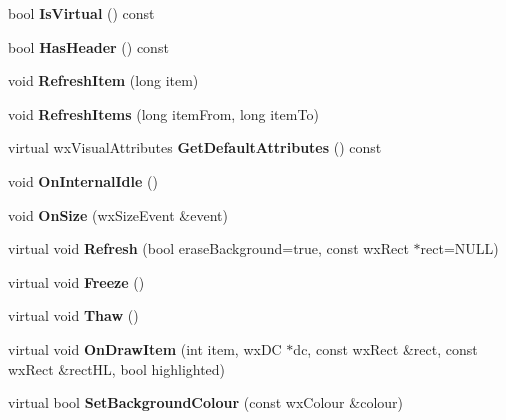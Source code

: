 \begin{DoxyCompactItemize}
\item 
bool {\bfseries IsVirtual} () const \label{classMuleExtern_1_1wxGenericListCtrl_aef095ce46b4004f0be09e32748c814f0}

\item 
bool {\bfseries HasHeader} () const \label{classMuleExtern_1_1wxGenericListCtrl_a19df121ef4b268e0e886bab5039f1189}

\item 
void {\bfseries RefreshItem} (long item)\label{classMuleExtern_1_1wxGenericListCtrl_aae6dbb4a8a9903417edfcfcee4a8ad34}

\item 
void {\bfseries RefreshItems} (long itemFrom, long itemTo)\label{classMuleExtern_1_1wxGenericListCtrl_a32b62746557d4c01b07135764566f62f}

\item 
virtual wxVisualAttributes {\bfseries GetDefaultAttributes} () const \label{classMuleExtern_1_1wxGenericListCtrl_ac2555a73bb1151c3d041fb5d2ae1e8d2}

\item 
void {\bfseries OnInternalIdle} ()\label{classMuleExtern_1_1wxGenericListCtrl_af873b84f2267f2c4fa73a2386ea4c1db}

\item 
void {\bfseries OnSize} (wxSizeEvent \&event)\label{classMuleExtern_1_1wxGenericListCtrl_a81b7575f671b9ec4d79bd1590777f1fd}

\item 
virtual void {\bfseries Refresh} (bool eraseBackground=true, const wxRect $\ast$rect=NULL)\label{classMuleExtern_1_1wxGenericListCtrl_a1d070fd4300bc7b1771290081767b5b6}

\item 
virtual void {\bfseries Freeze} ()\label{classMuleExtern_1_1wxGenericListCtrl_a283564df197e56496a160900238ec0e9}

\item 
virtual void {\bfseries Thaw} ()\label{classMuleExtern_1_1wxGenericListCtrl_a192a8a1a62a81df0b992a7822a6dbaa0}

\item 
virtual void {\bfseries OnDrawItem} (int item, wxDC $\ast$dc, const wxRect \&rect, const wxRect \&rectHL, bool highlighted)\label{classMuleExtern_1_1wxGenericListCtrl_ac710d99e0c19cb99ae07ddc77f58fa18}

\item 
virtual bool {\bfseries SetBackgroundColour} (const wxColour \&colour)\label{classMuleExtern_1_1wxGenericListCtrl_a2b4efa0b16fc5c1e67e5d609c2706ba8}


\end{DoxyCompactItemize}
